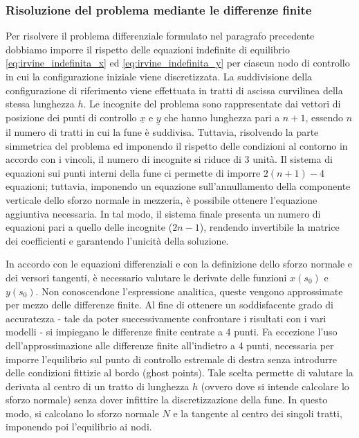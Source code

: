 \subsubsection{Risoluzione del problema mediante le differenze finite}
Per risolvere il problema differenziale formulato nel paragrafo precedente dobbiamo imporre il rispetto delle equazioni indefinite di equilibrio \eqref{eq:irvine_indefinita_x} ed \eqref{eq:irvine_indefinita_y} per ciascun nodo di controllo in cui la configurazione iniziale viene discretizzata. La suddivisione della configurazione di riferimento viene effettuata in tratti di ascissa curvilinea della stessa lunghezza $h$. Le incognite del problema sono rappresentate dai vettori di posizione dei punti di controllo $\underline{x}$ e $\underline{y}$ che hanno lunghezza pari a $n+1$, essendo $n$ il numero di tratti in cui la fune è suddivisa. Tuttavia, risolvendo la parte simmetrica del problema ed imponendo il rispetto delle condizioni al contorno in accordo con i vincoli, il numero di incognite si riduce di 3 unità. Il sistema di equazioni sui punti interni della fune ci permette di imporre $2(n+1) - 4$ equazioni; tuttavia, imponendo un equazione sull'annullamento della componente verticale dello sforzo normale in mezzeria, è possibile ottenere l'equazione aggiuntiva necessaria. In tal modo, il sistema finale presenta un numero di equazioni pari a quello delle incognite ($2n-1$), rendendo invertibile la matrice dei coefficienti e garantendo l'unicità della soluzione. 

In accordo con le equazioni differenziali e con la definizione dello sforzo normale e dei versori tangenti, è necessario valutare le derivate delle funzioni $x(s_0)$ e $y(s_0)$. Non conoscendone l'espressione analitica, queste vengono approssimate per mezzo delle differenze finite. Al fine di ottenere un soddisfacente grado di accuratezza - tale da poter successivamente confrontare i risultati con i vari modelli - si impiegano le differenze finite centrate a 4 punti. Fa eccezione l'uso dell'approssimazione alle differenze finite all'indietro a 4 punti, necessaria per imporre l'equilibrio sul punto di controllo estremale di destra senza introdurre delle condizioni fittizie al bordo (ghost points). Tale scelta permette di valutare la derivata al centro di un tratto di lunghezza $h$ (ovvero dove si intende calcolare lo sforzo normale) senza dover infittire la discretizzazione della fune. In questo modo, si calcolano lo sforzo normale $N$ e la tangente al centro dei singoli tratti, imponendo poi l'equilibrio ai nodi.

